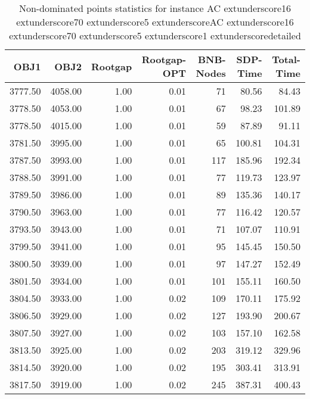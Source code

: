 \begin{table}
\caption{Non-dominated points statistics for instance AC	extunderscore16	extunderscore70	extunderscore5	extunderscoreAC	extunderscore16	extunderscore70	extunderscore5	extunderscore1	extunderscoredetailed}
\label{tab:stats/AC_16_70_5_AC_16_70_5_1_detailed}
\begin{tabular}{rrrrrrr}
\toprule
OBJ1 & OBJ2 & Rootgap & Rootgap-OPT & BNB-Nodes & SDP-Time & Total-Time \\
\midrule
3777.50 & 4058.00 & 1.00 & 0.01 & 71 & 80.56 & 84.43 \\
3778.50 & 4053.00 & 1.00 & 0.01 & 67 & 98.23 & 101.89 \\
3778.50 & 4015.00 & 1.00 & 0.01 & 59 & 87.89 & 91.11 \\
3781.50 & 3995.00 & 1.00 & 0.01 & 65 & 100.81 & 104.31 \\
3787.50 & 3993.00 & 1.00 & 0.01 & 117 & 185.96 & 192.34 \\
3788.50 & 3991.00 & 1.00 & 0.01 & 77 & 119.73 & 123.97 \\
3789.50 & 3986.00 & 1.00 & 0.01 & 89 & 135.36 & 140.17 \\
3790.50 & 3963.00 & 1.00 & 0.01 & 77 & 116.42 & 120.57 \\
3793.50 & 3943.00 & 1.00 & 0.01 & 71 & 107.07 & 110.91 \\
3799.50 & 3941.00 & 1.00 & 0.01 & 95 & 145.45 & 150.50 \\
3800.50 & 3939.00 & 1.00 & 0.01 & 97 & 147.27 & 152.49 \\
3801.50 & 3934.00 & 1.00 & 0.01 & 101 & 155.11 & 160.50 \\
3804.50 & 3933.00 & 1.00 & 0.02 & 109 & 170.11 & 175.92 \\
3806.50 & 3929.00 & 1.00 & 0.02 & 127 & 193.90 & 200.67 \\
3807.50 & 3927.00 & 1.00 & 0.02 & 103 & 157.10 & 162.58 \\
3813.50 & 3925.00 & 1.00 & 0.02 & 203 & 319.12 & 329.96 \\
3814.50 & 3920.00 & 1.00 & 0.02 & 195 & 303.41 & 313.91 \\
3817.50 & 3919.00 & 1.00 & 0.02 & 245 & 387.31 & 400.43 \\
\bottomrule
\end{tabular}
\end{table}
